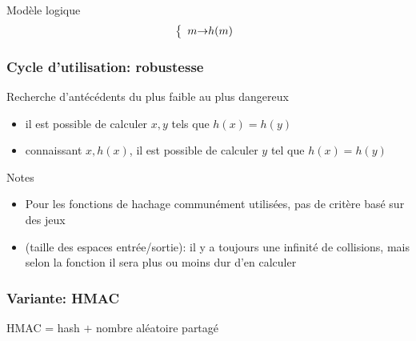 \begin{reveals}
\begin{frame}
  \vfill

  \begin{block}{Modèle logique}
    \[
      \left\lbrace
        \begin{array}{r@{\ensuremath{\rightarrow}}l}
          m & h(m)\\
        \end{array}
      \right.
    \]
  \end{block}

  \vfill


\end{frame}


\begin{frame}
  \frametitle{Cycle d'utilisation: robustesse}

  \vfill

   \begin{block}{Recherche d'antécédents}
     du plus faible au plus dangereux
       \begin{itemize}
       \item il est possible de calculer \(x,y\) tels que \(h(x) = h(y)\)
       \item connaissant \(x,h(x)\), il est possible de calculer \(y\) tel que
         \(h(x) = h(y)\)
       \end{itemize}
  \end{block}

  \vfill

  \begin{block}{Notes}
    \begin{itemize}
    \item Pour les fonctions de hachage communément utilisées, pas de
      critère basé sur des jeux
    \item (taille des espaces entrée/sortie): il y a toujours une
      infinité de collisions, mais selon la fonction il sera plus ou
      moins dur d'en calculer
    \end{itemize}
  \end{block}

  \vfill

\end{frame}




\begin{frame}
  \frametitle{Variante: HMAC}

  \vfill

  \begin{center}
    HMAC = hash \(+\) nombre aléatoire partagé
  \end{center}
  \vfill


\end{frame}
\end{reveals}
